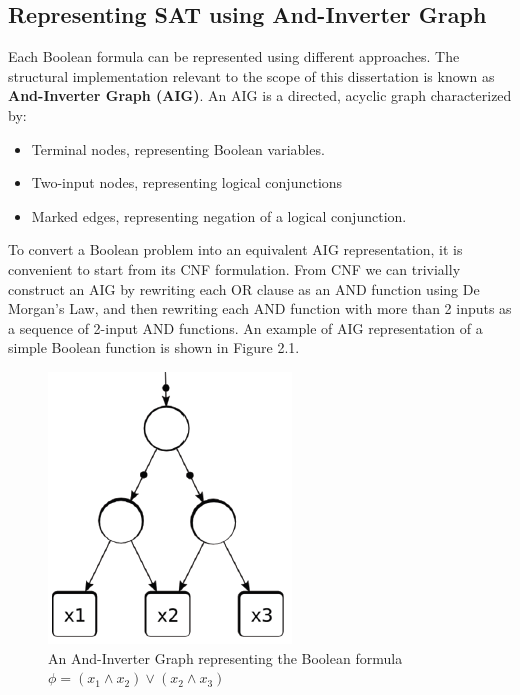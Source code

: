 \subsection{Representing SAT using And-Inverter Graph}

Each Boolean formula can be represented using different approaches. The structural implementation relevant to the scope of this dissertation is known as \textbf{And-Inverter Graph (AIG)}. An AIG is a directed, acyclic graph characterized by:

\begin{itemize}
    \item Terminal nodes, representing Boolean variables.
    \item Two-input nodes, representing logical conjunctions
    \item Marked edges, representing negation of a logical conjunction.
\end{itemize}

To convert a Boolean problem into an equivalent AIG representation, it is convenient to start from its CNF formulation. From CNF we can trivially construct an AIG by rewriting each OR clause as an AND function using De Morgan’s Law, and then rewriting each AND function with more than 2 inputs as a sequence of 2-input AND functions. An example of AIG representation of a simple Boolean function is shown in Figure 2.1. 

\begin{figure}[t]
	\begin{center}
	\includegraphics{images/AIG.png}
	\caption{An And-Inverter Graph representing the Boolean formula $\phi = (x_1 \wedge x_2) \vee (x_2 \wedge x_3)$}
	\end{center}
\end{figure}



